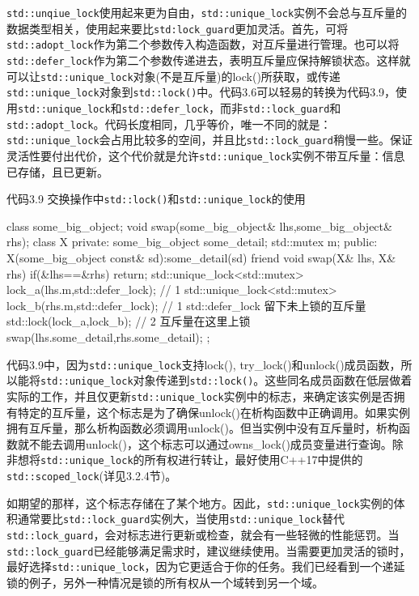 
\texttt{std::unqiue\_lock}使用起来更为自由，\texttt{std::unique\_lock}实例不会总与互斥量的数据类型相关，使用起来要比\texttt{std:lock\_guard}更加灵活。首先，可将\texttt{std::adopt\_lock}作为第二个参数传入构造函数，对互斥量进行管理。也可以将\texttt{std::defer\_lock}作为第二个参数传递进去，表明互斥量应保持解锁状态。这样就可以让\texttt{std::unique\_lock}对象(不是互斥量)的lock()所获取，或传递\texttt{std::unique\_lock}对象到\texttt{std::lock()}中。代码3.6可以轻易的转换为代码3.9，使用\texttt{std::unique\_lock}和\texttt{std::defer\_lock}，而非\texttt{std::lock\_guard}和\texttt{std::adopt\_lock}。代码长度相同，几乎等价，唯一不同的就是：\texttt{std::unique\_lock}会占用比较多的空间，并且比\texttt{std::lock\_guard}稍慢一些。保证灵活性要付出代价，这个代价就是允许\texttt{std::unique\_lock}实例不带互斥量：信息已存储，且已更新。

代码3.9 交换操作中\texttt{std::lock()}和\texttt{std::unique\_lock}的使用

\begin{cpp}
class some_big_object;
void swap(some_big_object& lhs,some_big_object& rhs);
class X
{
private:
  some_big_object some_detail;
  std::mutex m;
public:
  X(some_big_object const& sd):some_detail(sd){}
  friend void swap(X& lhs, X& rhs)
  {
    if(&lhs==&rhs)
      return;
    std::unique_lock<std::mutex> lock_a(lhs.m,std::defer_lock); // 1
    std::unique_lock<std::mutex> lock_b(rhs.m,std::defer_lock); // 1 std::defer_lock 留下未上锁的互斥量
    std::lock(lock_a,lock_b); // 2 互斥量在这里上锁
    swap(lhs.some_detail,rhs.some_detail);
  }
};
\end{cpp}

代码3.9中，因为\texttt{std::unique\_lock}支持lock(), try\_lock()和unlock()成员函数，所以能将\texttt{std::unique\_lock}对象传递到\texttt{std::lock()}。这些同名成员函数在低层做着实际的工作，并且仅更新\texttt{std::unique\_lock}实例中的标志，来确定该实例是否拥有特定的互斥量，这个标志是为了确保unlock()在析构函数中正确调用。如果实例拥有互斥量，那么析构函数必须调用unlock()。但当实例中没有互斥量时，析构函数就不能去调用unlock()，这个标志可以通过owns\_lock()成员变量进行查询。除非想将\texttt{std::unique\_lock}的所有权进行转让，最好使用C++17中提供的\texttt{std::scoped\_lock}(详见3.2.4节)。

如期望的那样，这个标志存储在了某个地方。因此，\texttt{std::unique\_lock}实例的体积通常要比\texttt{std::lock\_guard}实例大，当使用\texttt{std::unique\_lock}替代\texttt{std::lock\_guard}，会对标志进行更新或检查，就会有一些轻微的性能惩罚。当\texttt{std::lock\_guard}已经能够满足需求时，建议继续使用。当需要更加灵活的锁时，最好选择\texttt{std::unique\_lock}，因为它更适合于你的任务。我们已经看到一个递延锁的例子，另外一种情况是锁的所有权从一个域转到另一个域。

